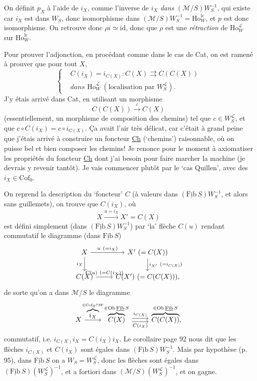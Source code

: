 \documentclass[11pt]{article}
\newcommand{\printedpage}[1]{\marginpar{\footnotesize p.~#1}}
\newcommand{\msp}[1]{\marginpar{\footnotesize [#1]}}
\newcommand{\Fibu}{\underline{\mathrm{Fib}}\,}
\newcommand{\Ho}{\mathrm{Ho}}
\newcommand{\WL}{W_S^{\mathcal{L}}}
\begin{document}
On définit $p_X$ à l'aide de $i_X$, comme l'inverse de $i_X$ \textit{dans} $(\mathcal{M}/S)W_S^{-1}$, qui existe car \msp{page 99} $i_X$ est dans $W_S$, donc isomorphisme dans $(\mathcal{M}/S)W_S^{-1} = \Ho_W^{\mathrm{lc}}$, et $p$ est donc isomorphisme. On retrouve donc $\rho i \simeq \mathrm{id}$, donc que $\rho$ est une \textit{rétraction} de $\Ho_W^{\mathcal{L}}$ sur $\Ho_W^{\mathrm{lc}}$.

Pour prouver l'adjonction, en procédant comme dans le cas de Cat, on est ramené à prouver que pour tout $X$,
\[
\left\{
\begin{aligned}
&C(i_X) = i_{C(X)} : C(X) \rightrightarrows C(C(X))\\
&\textit{dans } \Ho_W^{\mathcal{L}} \ (\text{localisation par } \WL).
\end{aligned}
\right.
\]
J'y étais arrivé dans Cat, en utilisant un morphisme
\[
C(C(X)) \xrightarrow{\ c\ } C(X)
\]
(essentiellement, un morphisme de composition des chemins) tel que $c \in \WL$, et que $c \circ C(i_X) = c \circ i_{C(X)}$. Ça avait l'air très délicat, car c'était à grand peine que j'étais arrivé à construire un foncteur \underline{Ch} (`chemins') raisonnable, où on puisse bel et bien composer les chemins! Je renonce pour le moment à axiomatiser les propriétés du foncteur \underline{Ch} dont j'ai besoin pour faire marcher la machine (je devrais y revenir tantôt). Je vais commencer plutôt par le `cas Quillen', avec des $i_X \in \mathrm{Cof}_0$.

\printedpage{63}
\msp{page 100}

On reprend la description du `foncteur' $C$ (à valeurs dans $(\Fibu S)W_S^{-1}$, et alors sans guillemets), on trouve que $C(i_X)$, où
\[
X \xrightarrow{u = i_X} X' = C(X)
\]
est défini simplement (dans $(\Fibu S)W_S^{-1}$) par `la' flèche $C(u)$ rendant commutatif le diagramme (dans $\Fibu S$)
\[
\begin{tikzcd}
X \arrow[r, "u\ (=i_X)"] \arrow[d, "i_X"'] & X'\ (= C(X)) \arrow[d, "i_{X'}\ (=i_{C(X)})"] \\
C(X) \arrow[r, "C(u)\ (=C(i_X))"] & C(X')\ (= C(C(X))),
\end{tikzcd}
\]
de sorte qu'on a dans $\mathcal{M}/S$ le diagramme
\[
\begin{tikzcd}
X \arrow[r, "\overbrace{i_X}^{\in\mathrm{Cof}_0\cap W}"] & \overbrace{C(X)}^{\in\mathrm{Ob}\,\Fibu S} \arrow[r, shift left, "i_{C(X)}"] \arrow[r, shift right, "C(i_X)"'] & \overbrace{C(C(X))}^{\in\mathrm{Ob}\,\Fibu S},
\end{tikzcd}
\]
commutatif, i.e. $i_{C(X)}i_X = C(i_X)i_X$. Le corollaire page 92 nous dit que les flèches $i_{C(X)}$ et $C(i_X)$ sont égales dans $(\Fibu S)W_S^{-1}$. Mais par hypothèse (p. 95), dans $\Fibu S$ on a $W_S = \WL$, donc les flèches sont égales dans $(\Fibu S)(\WL)^{-1}$, et a fortiori dans $(\mathcal{M}/S)(\WL)^{-1}$, et on gagne.
\end{document}
